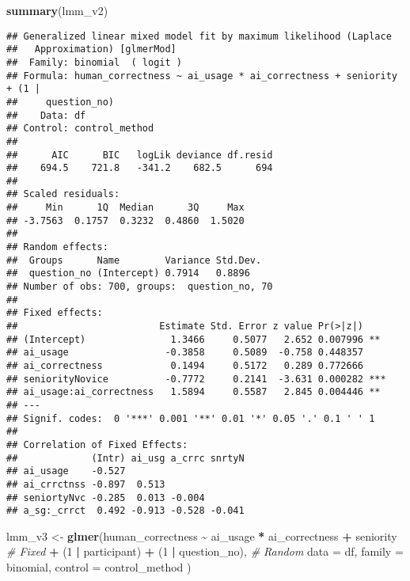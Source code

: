 \documentclass[
]{article}
\newenvironment{Shaded}{\begin{snugshade}}{\end{snugshade}}
\newcommand{\AttributeTok}[1]{\textcolor[rgb]{0.13,0.29,0.53}{#1}}
\newcommand{\CommentTok}[1]{\textcolor[rgb]{0.56,0.35,0.01}{\textit{#1}}}
\newcommand{\DecValTok}[1]{\textcolor[rgb]{0.00,0.00,0.81}{#1}}
\newcommand{\FunctionTok}[1]{\textcolor[rgb]{0.13,0.29,0.53}{\textbf{#1}}}
\newcommand{\NormalTok}[1]{#1}
\newcommand{\OtherTok}[1]{\textcolor[rgb]{0.56,0.35,0.01}{#1}}
\newcommand{\SpecialCharTok}[1]{\textcolor[rgb]{0.81,0.36,0.00}{\textbf{#1}}}
\begin{document}
\begin{Shaded}
\begin{Highlighting}[]
\FunctionTok{summary}\NormalTok{(lmm\_v2)}
\end{Highlighting}
\end{Shaded}

\begin{verbatim}
## Generalized linear mixed model fit by maximum likelihood (Laplace
##   Approximation) [glmerMod]
##  Family: binomial  ( logit )
## Formula: human_correctness ~ ai_usage * ai_correctness + seniority + (1 |  
##     question_no)
##    Data: df
## Control: control_method
## 
##      AIC      BIC   logLik deviance df.resid 
##    694.5    721.8   -341.2    682.5      694 
## 
## Scaled residuals: 
##     Min      1Q  Median      3Q     Max 
## -3.7563  0.1757  0.3232  0.4860  1.5020 
## 
## Random effects:
##  Groups      Name        Variance Std.Dev.
##  question_no (Intercept) 0.7914   0.8896  
## Number of obs: 700, groups:  question_no, 70
## 
## Fixed effects:
##                         Estimate Std. Error z value Pr(>|z|)    
## (Intercept)               1.3466     0.5077   2.652 0.007996 ** 
## ai_usage                 -0.3858     0.5089  -0.758 0.448357    
## ai_correctness            0.1494     0.5172   0.289 0.772666    
## seniorityNovice          -0.7772     0.2141  -3.631 0.000282 ***
## ai_usage:ai_correctness   1.5894     0.5587   2.845 0.004446 ** 
## ---
## Signif. codes:  0 '***' 0.001 '**' 0.01 '*' 0.05 '.' 0.1 ' ' 1
## 
## Correlation of Fixed Effects:
##             (Intr) ai_usg a_crrc snrtyN
## ai_usage    -0.527                     
## ai_crrctnss -0.897  0.513              
## seniortyNvc -0.285  0.013 -0.004       
## a_sg:_crrct  0.492 -0.913 -0.528 -0.041
\end{verbatim}

\begin{Shaded}
\begin{Highlighting}[]
\NormalTok{lmm\_v3 }\OtherTok{\textless{}{-}} \FunctionTok{glmer}\NormalTok{(human\_correctness }\SpecialCharTok{\textasciitilde{}}\NormalTok{ ai\_usage }\SpecialCharTok{*}\NormalTok{ ai\_correctness }\SpecialCharTok{+}\NormalTok{ seniority }\CommentTok{\# Fixed}
                \SpecialCharTok{+}\NormalTok{ (}\DecValTok{1} \SpecialCharTok{|}\NormalTok{ participant) }\SpecialCharTok{+}\NormalTok{ (}\DecValTok{1} \SpecialCharTok{|}\NormalTok{ question\_no), }\CommentTok{\# Random}
                \AttributeTok{data =}\NormalTok{ df, }\AttributeTok{family =}\NormalTok{ binomial,}
                \AttributeTok{control =}\NormalTok{ control\_method}
\NormalTok{                )}
\end{Highlighting}
\end{Shaded}
\end{document}
